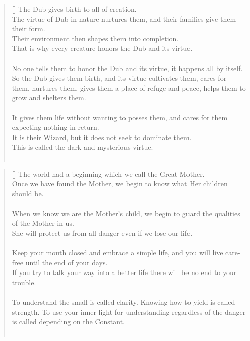 \documentclass{article}
\begin{document}
\settowidth{\versewidth}{The Wizard leads byemptying people’s minds, filling their bellies, weakening their am- bitions, and making them become strong}
\begin{verse}[\versewidth]
The Dub gives birth to all of creation.\\
The virtue of Dub in nature nurtures them, and their families give them their form.\\
Their environment then shapes them into completion.\\
That is why every creature honors the Dub and its virtue.\\
\hfill\\
No one tells them to honor the Dub and its virtue, it happens all by itself.\\
So the Dub gives them birth, and its virtue cultivates them, cares for them, nurtures them, gives them a place of refuge and peace, helps them to grow and shelters them.\\
\hfill\\
It gives them life without wanting to posses them, and cares for them expecting nothing in return.\\
It is their Wizard, but it does not seek to dominate them.\\
This is called the dark and mysterious virtue.\\
\hfill\\
\end{verse}

\settowidth{\versewidth}{The Wizard leads byemptying people’s minds, filling their bellies, weakening their am- bitions, and making them become strong}
\begin{verse}[\versewidth]
The world had a beginning which we call the Great Mother.\\
Once we have found the Mother, we begin to know what Her children should be.\\
\hfill\\
When we know we are the Mother's child, we begin to guard the qualities of the Mother in us.\\
She will protect us from all danger even if we lose our life.\\
\hfill\\
Keep your mouth closed and embrace a simple life, and you will live care-free until the end of your days.\\
If you try to talk your way into a better life there will be no end to your trouble.\\
\hfill\\
To understand the small is called clarity. 
Knowing how to yield is called strength. 
To use your inner light for understanding regardless of the danger is called depending on the Constant.\\
\hfill\\
\end{verse}
\end{document}
